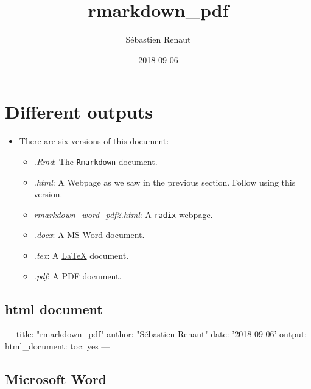 \documentclass[]{article}
\title{rmarkdown\_pdf}
\author{Sébastien Renaut}
\date{2018-09-06}
\newenvironment{Shaded}{\begin{snugshade}}{\end{snugshade}}
\newcommand{\NormalTok}[1]{#1}
\providecommand{\tightlist}{%
  \setlength{\itemsep}{0pt}\setlength{\parskip}{0pt}}
\begin{document}
\maketitle

{
\setcounter{tocdepth}{2}
\tableofcontents
}
\hypertarget{different-outputs}{%
\section{Different outputs}\label{different-outputs}}

\begin{itemize}
\tightlist
\item
  There are six versions of this document:

  \begin{itemize}
  \tightlist
  \item
    \emph{.Rmd}: The \texttt{Rmarkdown} document.
  \item
    \emph{.html}: A Webpage as we saw in the previous section. Follow
    using this version.
  \item
    \emph{rmarkdown\_word\_pdf2.html}: A \texttt{radix} webpage.
  \item
    \emph{.docx}: A MS Word document.
  \item
    \emph{.tex}: A \href{https://www.latex-project.org}{LaTeX} document.
  \item
    \emph{.pdf}: A PDF document.
  \end{itemize}
\end{itemize}

\hypertarget{html-document}{%
\subsection{html document}\label{html-document}}

\begin{Shaded}
\begin{Highlighting}[]
\NormalTok{---    }
\NormalTok{title: "rmarkdown_pdf"    }
\NormalTok{author: "Sébastien Renaut"    }
\NormalTok{date: '2018-09-06'    }
\NormalTok{output: }
\NormalTok{  html_document: }
\NormalTok{    toc: yes  }
\NormalTok{--- }
\end{Highlighting}
\end{Shaded}

\hypertarget{microsoft-word}{%
\subsection{Microsoft Word}\label{microsoft-word}}
\end{document}
